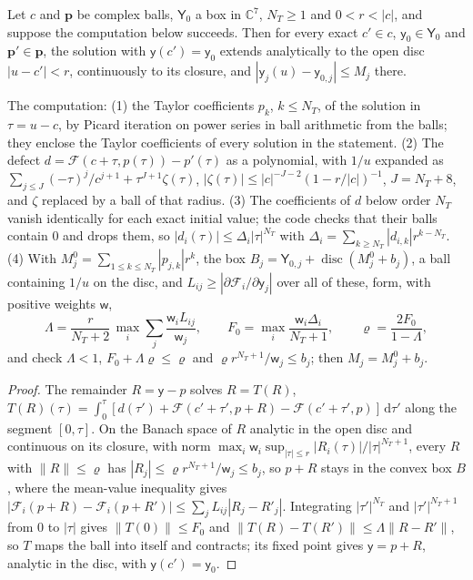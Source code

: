 \documentclass{amsart}
\numberwithin{equation}{section}
\theoremstyle{plain}
\newenvironment{lemnamed}[1]{\renewcommand\theinnerlem{#1}\innerlem}{\endinnerlem}
\theoremstyle{definition}
\theoremstyle{remark}
\newcommand{\dd}{\mathrm{d}}
\begin{document}
\begin{lemnamed}{D (disc lemma)}\label{lem:D}
Let $c$ and $\mathbf p$ be complex balls, $\mathsf Y_0$ a box in $\mathbb C^7$, $N_T \ge 1$ and $0 < r < |c|$, and suppose the computation
below succeeds. Then for every exact $c' \in c$, $\mathsf y_0 \in \mathsf Y_0$ and $\mathbf p' \in \mathbf p$, the solution with $\mathsf y(c') = \mathsf y_0$
extends analytically to the open disc $|u - c'| < r$, continuously to its closure, and $|\mathsf y_j(u) - \mathsf y_{0,j}| \le M_j$ there.
\end{lemnamed}

The computation: (1) the Taylor coefficients $p_k$, $k \le N_T$, of the solution in $\tau = u - c$, by Picard iteration on power
series in ball arithmetic from the balls; they enclose the Taylor coefficients of every solution in the statement.
(2) The defect $d = \mathcal F(c + \tau, p(\tau)) - p'(\tau)$ as a polynomial, with $1/u$ expanded as
$\sum_{j\le J}(-\tau)^j/c^{j+1} + \tau^{J+1}\zeta(\tau)$, $|\zeta(\tau)| \le |c|^{-J-2}(1 - r/|c|)^{-1}$, $J = N_T + 8$, and $\zeta$ replaced by
a ball of that radius. (3) The coefficients of $d$ below order $N_T$ vanish identically for each exact initial value; the code
checks that their balls contain $0$ and drops them, so $|d_i(\tau)| \le \Delta_i|\tau|^{N_T}$ with
$\Delta_i = \sum_{k\ge N_T}|d_{i,k}|r^{k-N_T}$. (4) With $M^0_j = \sum_{1\le k\le N_T}|p_{j,k}|r^k$, the box
$B_j = \mathsf Y_{0,j} + \operatorname{disc}(M^0_j + b_j)$, a ball containing $1/u$ on the disc, and $L_{ij} \ge |\partial\mathcal F_i/\partial\mathsf y_j|$
over all of these, form, with positive weights $\mathsf w$,
\[
\Lambda = \frac{r}{N_T+2}\,\max_i\sum_j\frac{\mathsf w_iL_{ij}}{\mathsf w_j}, \qquad F_0 = \max_i\frac{\mathsf w_i\Delta_i}{N_T+1}, \qquad
\varrho = \frac{2F_0}{1-\Lambda},
\]
and check $\Lambda < 1$, $F_0 + \Lambda\varrho \le \varrho$ and $\varrho r^{N_T+1}/\mathsf w_j \le b_j$; then $M_j = M^0_j + b_j$.

\begin{proof}
The remainder $R = \mathsf y - p$ solves $R = T(R)$, $T(R)(\tau) = \int_0^\tau[d(\tau') + \mathcal F(c' + \tau', p + R) - \mathcal F(c' + \tau', p)]\,\dd\tau'$
along the segment $[0, \tau]$. On the Banach space of $R$ analytic in the open disc and continuous on its closure, with norm
$\max_i\mathsf w_i\sup_{|\tau|\le r}|R_i(\tau)|/|\tau|^{N_T+1}$, every $R$ with $\|R\| \le \varrho$ has $|R_j| \le \varrho r^{N_T+1}/\mathsf w_j \le b_j$, so
$p + R$ stays in the convex box $B$, where the mean-value inequality gives
$|\mathcal F_i(p + R) - \mathcal F_i(p + R')| \le \sum_jL_{ij}|R_j - R'_j|$. Integrating $|\tau'|^{N_T}$ and $|\tau'|^{N_T+1}$ from $0$ to $|\tau|$ gives
$\|T(0)\| \le F_0$ and $\|T(R) - T(R')\| \le \Lambda\|R - R'\|$, so $T$ maps the ball into itself and contracts; its fixed point gives
$\mathsf y = p + R$, analytic in the disc, with $\mathsf y(c') = \mathsf y_0$.
\end{proof}
\end{document}
